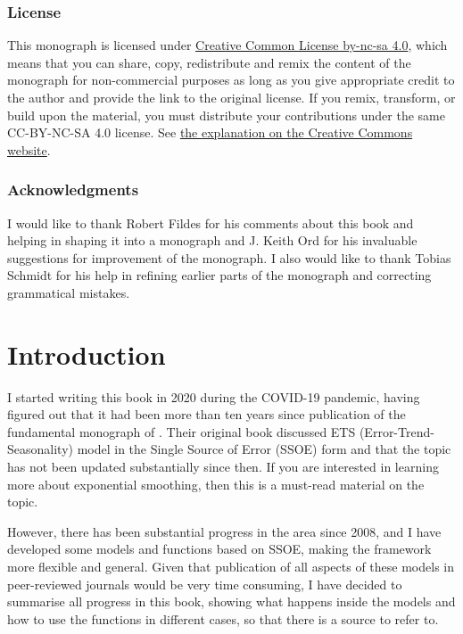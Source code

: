 \documentclass[]{book}
\theoremstyle{definition}
\theoremstyle{definition}
\theoremstyle{definition}
\theoremstyle{definition}
\theoremstyle{remark}
\begin{document}
\hypertarget{license}{%
\subsection*{License}\label{license}}

This monograph is licensed under \href{https://creativecommons.org/licenses/by-nc-sa/4.0/}{Creative Common License by-nc-sa 4.0}, which means that you can share, copy, redistribute and remix the content of the monograph for non-commercial purposes as long as you give appropriate credit to the author and provide the link to the original license. If you remix, transform, or build upon the material, you must distribute your contributions under the same CC-BY-NC-SA 4.0 license. See \href{https://creativecommons.org/licenses/by-nc-sa/4.0/}{the explanation on the Creative Commons website}.

\hypertarget{acknowledgments}{%
\subsection*{Acknowledgments}\label{acknowledgments}}

I would like to thank Robert Fildes for his comments about this book and helping in shaping it into a monograph and J. Keith Ord for his invaluable suggestions for improvement of the monograph. I also would like to thank Tobias Schmidt for his help in refining earlier parts of the monograph and correcting grammatical mistakes.

\hypertarget{intro}{%
\chapter{Introduction}\label{intro}}

I started writing this book in 2020 during the COVID-19 pandemic, having figured out that it had been more than ten years since publication of the fundamental monograph of \citet{Hyndman2008b}. Their original book discussed ETS (Error-Trend-Seasonality) model in the Single Source of Error (SSOE) form and that the topic has not been updated substantially since then. If you are interested in learning more about exponential smoothing, then this is a must-read material on the topic.

However, there has been substantial progress in the area since 2008, and I have developed some models and functions based on SSOE, making the framework more flexible and general. Given that publication of all aspects of these models in peer-reviewed journals would be very time consuming, I have decided to summarise all progress in this book, showing what happens inside the models and how to use the functions in different cases, so that there is a source to refer to.
\end{document}

